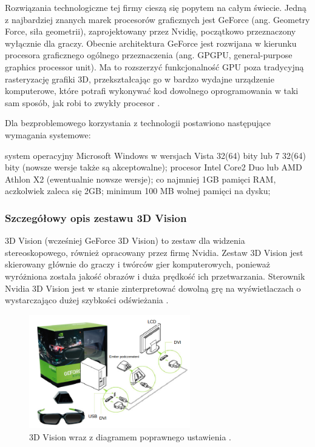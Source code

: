Rozwiązania technologiczne tej firmy cieszą się popytem na całym świecie. Jedną z najbardziej znanych marek procesorów graficznych jest GeForce (ang. Geometry Force, siła geometrii), zaprojektowany przez Nvidię, początkowo przeznaczony wyłącznie dla graczy. Obecnie architektura GeForce jest rozwijana w kierunku procesora graficznego ogólnego przeznaczenia (ang. GPGPU, general-purpose graphics processor unit). Ma to rozszerzyć funkcjonalność GPU poza tradycyjną rasteryzację grafiki 3D, przekształcając go w bardzo wydajne urządzenie komputerowe, które potrafi wykonywać kod dowolnego oprogramowania w taki sam sposób, jak robi to zwykły procesor \cite{GeForce}. 

Dla bezproblemowego korzystania z technologii postawiono następujące wymagania systemowe: 

\begin{itemize}
\itemi system operacyjny Microsoft Windows w wersjach Vista 32(64) bity lub 7 32(64) bity (nowsze wersje także są akceptowalne);
\itemi procesor  Intel Core2 Duo lub AMD Athlon X2 (ewentualnie nowsze wersje);
\itemi co najmniej 1GB pamięci RAM, aczkolwiek zaleca się 2GB;
\itemi minimum 100 MB wolnej pamięci na dysku;
\end{itemize}

\subsubsection{Szczegółowy opis zestawu 3D Vision}
3D Vision (wcześniej GeForce 3D Vision) to zestaw dla widzenia stereoskopowego, również opracowany przez firmę Nvidia. Zestaw 3D Vision jest skierowany głównie do graczy i twórców gier komputerowych, ponieważ wyróżniona została jakość obrazów i duża prędkość ich przetwarzania. Sterownik Nvidia 3D Vision jest w stanie zinterpretować dowolną grę na wyświetlaczach o wystarczająco dużej szybkości odświeżania \cite{NvidiaInfo}. 

\begin{figure}[H]
		\centering
 		\includegraphics[width=7cm]{3dVision.png}
    	\caption{3D Vision wraz z diagramem poprawnego ustawienia \cite{3dVisionPic}.}
 		\label{rys29}
\end{figure}

